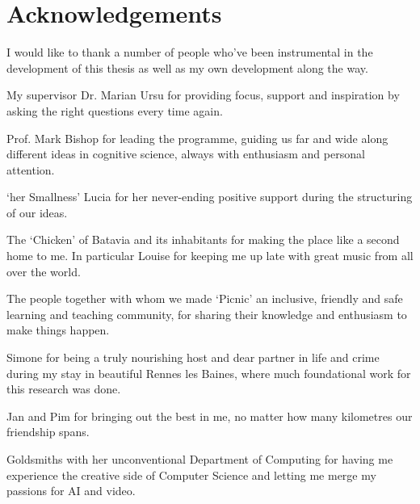 \chapter{Acknowledgements} 
\label{ch:acknowledgements}

I would like to thank a number of people who've been instrumental in the development of this thesis as well as my own development along the way.

My supervisor Dr. Marian Ursu for providing focus, support and inspiration by asking the right questions every time again.

Prof. Mark Bishop for leading the programme, guiding us far and wide along different ideas in cognitive science, always with enthusiasm and personal attention.

`her Smallness' Lucia for her never-ending positive support during the structuring of our ideas.

The `Chicken' of Batavia and its inhabitants for making the place like a second home to me. In particular Louise for keeping me up late with great music from all over the world.

The people together with whom we made `Picnic' an inclusive, friendly and safe learning and teaching community, for sharing their knowledge and enthusiasm to make things happen.

Simone for being a truly nourishing host and dear partner in life and crime during my stay in beautiful Rennes les Baines, where much foundational work for this research was done.

Jan and Pim for bringing out the best in me, no matter how many kilometres our friendship spans.

Goldsmiths with her unconventional Department of Computing for having me experience the creative side of Computer Science and letting me merge my passions for AI and video.